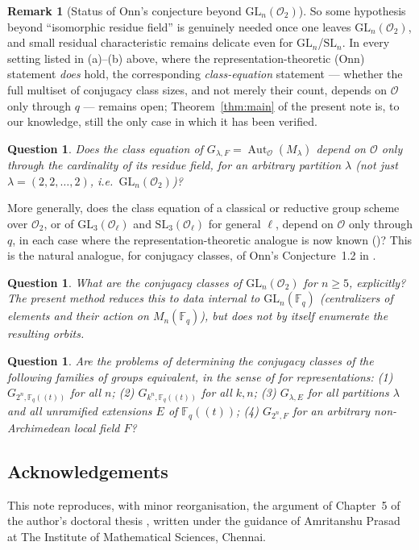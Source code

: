 \documentclass[11pt]{amsart}
\newtheorem{question}[theorem]{Question}
\theoremstyle{definition}
\newtheorem{remark}[theorem]{Remark}
\DeclareMathOperator{\Aut}{Aut}
\newcommand{\GL}{\mathrm{GL}}
\newcommand{\Fq}{\mathbb{F}_q}
\begin{document}
\begin{remark}[Status of Onn's conjecture beyond $\GL_n(\mathcal O_2)$]
		So some hypothesis beyond ``isomorphic residue field'' is genuinely
		needed once one leaves $\GL_n(\mathcal O_2)$, and small residual
		characteristic remains delicate even for $\GL_n$/$\mathrm{SL}_n$. In
		every setting listed in (a)--(b) above, where the representation-theoretic
		(Onn) statement \emph{does} hold, the corresponding
		\emph{class-equation} statement — whether the full multiset of conjugacy
		class sizes, and not merely their count, depends on $\mathcal O$ only
		through $q$ — remains open; Theorem~\ref{thm:main} of the present note is,
		to our knowledge, still the only case in which it has been verified.
	\end{remark}
	
	\begin{question}
		Does the class equation of $G_{\lambda,F}=\Aut_{\mathcal O}(M_\lambda)$
		depend on $\mathcal O$ only through the cardinality of its residue field,
		for an arbitrary partition $\lambda$ (not just $\lambda=(2,2,\dots,2)$,
		i.e.\ $\GL_n(\mathcal O_2)$)? 
	\end{question}
	More generally, does the class equation of
	a classical or reductive group scheme over $\mathcal O_2$, or of
	$\GL_3(\mathcal O_\ell)$ and $\mathrm{SL}_3(\mathcal O_\ell)$ for general
	$\ell$, depend on $\mathcal O$ only through $q$, in each case where the
	representation-theoretic analogue is now known
	(\cite{SinglaClassical2012,SVG2019,OPS2025})? This is the natural
	analogue, for conjugacy classes, of Onn's Conjecture~1.2 in \cite{Onn08}.
	\begin{question}
		What are the conjugacy classes of $\GL_n(\mathcal O_2)$ for $n\geq 5$,
		explicitly? The present method reduces this to data internal to
		$\GL_n(\Fq)$ (centralizers of elements and their action on $M_n(\Fq)$),
		but does not by itself enumerate the resulting orbits.
	\end{question}
	
	\begin{question}
		Are the problems of determining the conjugacy classes of the following
		families of groups equivalent, in the sense of \cite[Theorem~6.1]{AOPS}
		for representations: (1) $G_{2^n,\Fq((t))}$ for all $n$; (2)
		$G_{k^n,\Fq((t))}$ for all $k,n$; (3) $G_{\lambda,E}$ for all partitions
		$\lambda$ and all unramified extensions $E$ of $\Fq((t))$; (4)
		$G_{2^n,F}$ for an arbitrary non-Archimedean local field $F$?
	\end{question}
	
	
	\subsection*{Acknowledgements} This note reproduces, with minor
	reorganisation, the argument of Chapter~5 of the author's doctoral thesis
	\cite{Thesis}, written under the guidance of Amritanshu Prasad at The
	Institute of Mathematical Sciences, Chennai.
	
\end{document}
